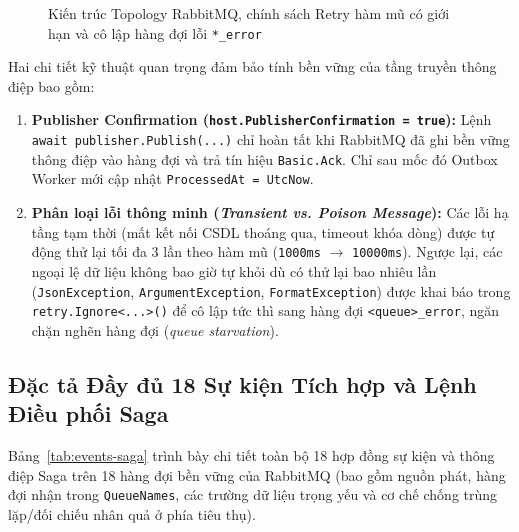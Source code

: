 \documentclass[12pt,a4paper]{article}
\begin{document}
\begin{figure}[htbp]
{%
}
\caption{Kiến trúc Topology RabbitMQ, chính sách Retry hàm mũ có giới hạn và cô lập hàng đợi lỗi \texttt{*\_error}}
\label{fig:rabbitmq-topology}
\end{figure}

Hai chi tiết kỹ thuật quan trọng đảm bảo tính bền vững của tầng truyền thông điệp bao gồm:
\begin{enumerate}[nosep]
    \item \textbf{Publisher Confirmation (\texttt{host.PublisherConfirmation = true}):} Lệnh \texttt{await publisher.Publish(...)} chỉ hoàn tất khi RabbitMQ đã ghi bền vững thông điệp vào hàng đợi và trả tín hiệu \texttt{Basic.Ack}. Chỉ sau mốc đó Outbox Worker mới cập nhật \texttt{ProcessedAt = UtcNow}.
    \item \textbf{Phân loại lỗi thông minh (\textit{Transient vs. Poison Message}):} Các lỗi hạ tầng tạm thời (mất kết nối CSDL thoáng qua, timeout khóa dòng) được tự động thử lại tối đa 3 lần theo hàm mũ (\texttt{1000ms} $\rightarrow$ \texttt{10000ms}). Ngược lại, các ngoại lệ dữ liệu không bao giờ tự khỏi dù có thử lại bao nhiêu lần (\texttt{JsonException}, \texttt{ArgumentException}, \texttt{FormatException}) được khai báo trong \texttt{retry.Ignore<...>()} để cô lập tức thì sang hàng đợi \texttt{<queue>\_error}, ngăn chặn nghẽn hàng đợi (\textit{queue starvation}).
\end{enumerate}

\subsection{Đặc tả Đầy đủ 18 Sự kiện Tích hợp và Lệnh Điều phối Saga}
Bảng~\ref{tab:events-saga} trình bày chi tiết toàn bộ 18 hợp đồng sự kiện và thông điệp Saga trên 18 hàng đợi bền vững của RabbitMQ (bao gồm nguồn phát, hàng đợi nhận trong \texttt{QueueNames}, các trường dữ liệu trọng yếu và cơ chế chống trùng lặp/đối chiếu nhân quả ở phía tiêu thụ).
\end{document}
